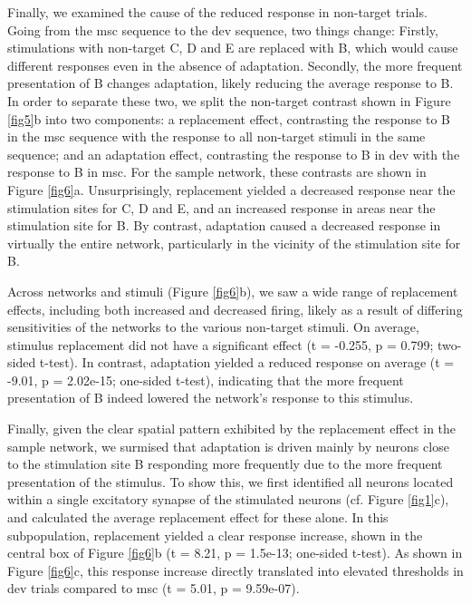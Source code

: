 \documentclass[pdflatex,referee,iicol,sn-basic]{sn-jnl}
\theoremstyle{thmstyleone}%
\theoremstyle{thmstyletwo}%
\theoremstyle{thmstylethree}%
\begin{document}
Finally, we examined the cause of the reduced response in non-target trials. Going from the msc sequence to the dev sequence, two things change: Firstly, stimulations with non-target C, D and E are replaced with B, which would cause different responses even in the absence of adaptation. Secondly, the more frequent presentation of B changes adaptation, likely reducing the average response to B.
In order to separate these two, we split the non-target contrast shown in Figure \ref{fig5}b into two components: a replacement effect, contrasting the response to B in the msc sequence with the response to all non-target stimuli in the same sequence; and an adaptation effect, contrasting the response to B in dev with the response to B in msc. For the sample network, these contrasts are shown in Figure \ref{fig6}a. Unsurprisingly, replacement yielded a decreased response near the stimulation sites for C, D and E, and an increased response in areas near the stimulation site for B. By contrast, adaptation caused a decreased response in virtually the entire network, particularly in the vicinity of the stimulation site for B.

Across networks and stimuli (Figure \ref{fig6}b), we saw a wide range of replacement effects, including both increased and decreased firing, likely as a result of differing sensitivities of the networks to the various non-target stimuli. On average, stimulus replacement did not have a significant effect (t = -0.255, p = 0.799; two-sided t-test). In contrast, adaptation yielded a reduced response on average (t = -9.01, p = 2.02e-15; one-sided t-test), indicating that the more frequent presentation of B indeed lowered the network's response to this stimulus.

Finally, given the clear spatial pattern exhibited by the replacement effect in the sample network, we surmised that adaptation is driven mainly by neurons close to the stimulation site B responding more frequently due to the more frequent presentation of the stimulus. To show this, we first identified all neurons located within a single excitatory synapse of the stimulated neurons (cf. Figure \ref{fig1}c), and calculated the average replacement effect for these alone. In this subpopulation, replacement yielded a clear response increase, shown in the central box of Figure \ref{fig6}b (t = 8.21, p = 1.5e-13; one-sided t-test). As shown in Figure \ref{fig6}c, this response increase directly translated into elevated thresholds in dev trials compared to msc (t = 5.01, p = 9.59e-07).
\end{document}
